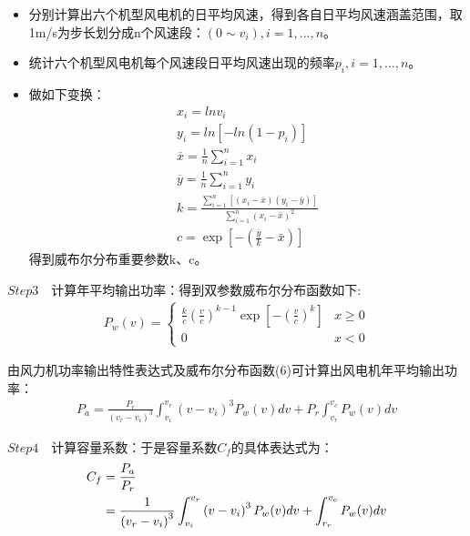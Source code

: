 \documentclass[withoutpreface,bwprint]{cumcmthesis} %
\begin{document}
		\begin{itemize}
			\item 分别计算出六个机型风电机的日平均风速，得到各自日平均风速涵盖范围，取1m/s为步长划分成n个风速段：$(0\sim v_i),i=1,\dots,n$。
			\item 统计六个机型风电机每个风速段日平均风速出现的频率$p_i,i=1,\dots,n$。
			\item 做如下变换：
			\begin{gather*}
				x_i=lnv_i\\
				y_i=ln[-ln(1-p_i)]\\
				\overline{x}=\frac{1}{n}\sum_{i=1}^{n}x_i\\
				\overline{y}=\frac{1}{n}\sum_{i=1}^{n}y_i\\
				k=\frac{\sum_{i=1}^{n}\left[\left(x_{i}-\bar{x}\right)\left(y_{i}-\bar{y}\right)\right]}{\sum_{i=1}^{n}\left(x_{i}-\bar{x}\right)^{2}} \\
				c=\exp \left[-\left(\frac{\bar{y}}{k}-\bar{x}\right)\right]
			\end{gather*}
		得到威布尔分布重要参数k、c。
		\end{itemize}\par
		$Step3\quad \textbf{计算年平均输出功率：}$得到双参数威布尔分布函数\supercite{威布尔分布}如下:
		\begin{gather}
			P_{w}(v)=
			 \begin{cases}
			\frac{k}{c}\left(\frac{v}{c}\right)^{k-1} \exp \left[-\left(\frac{v}{c}\right)^{k}\right]&x\geq0\\
			0 &  x<0 
			\end{cases}
		\end{gather}\par
		由风力机功率输出特性表达式及威布尔分布函数(6)可计算出风电机年平均输出功率：
		\begin{gather}
			P_{a}=\frac{P_{r}}{\left(v_{r}-v_{i}\right)^{3}} \int_{v_{i}}^{v_{r}}\left(v-v_{i}\right)^{3} P_{w}(v) d v+P_{r} \int_{v_{r}}^{v_{c}} P_{w}(v) d v
		\end{gather}\par
		$Step4\quad \textbf{计算容量系数：}$于是容量系数$C_f$的具体表达式\supercite{风能资源评估和机组选型在风电场选址中的应用}为：
		\begin{align}
			C_f&=\frac{P_a}{P_r}\notag\\
	           &=\frac{1}{\left(v_{r}-v_{i}\right)^{3}} \int_{v_{i}}^{v_{r}}\left(v-v_{i}\right)^{3} P_{w}(v) d v+\int_{r_{r}}^{v_{c}} P_{w}(v) d v		
		\end{align}\par
\end{document}
